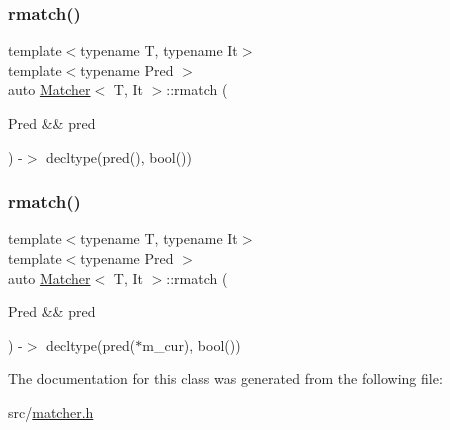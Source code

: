 \mbox{\label{class_matcher_a016cf13b6cf1119494a9723fb9419fd4}} 
\subsubsection{\texorpdfstring{rmatch()}{rmatch()}\hspace{0.1cm}{\footnotesize\ttfamily [1/2]}}
{\footnotesize\ttfamily template$<$typename T, typename It$>$ \\
template$<$typename Pred $>$ \\
auto \hyperlink{class_matcher}{Matcher}$<$ T, It $>$\+::rmatch (\begin{DoxyParamCaption}\item[{Pred \&\&}]{pred }\end{DoxyParamCaption}) -\/$>$ decltype(pred(), bool())
  \hspace{0.3cm}{\ttfamily [inline]}}

\mbox{\label{class_matcher_ad0b897b87cede7752c385e7d55bcaff4}} 
\subsubsection{\texorpdfstring{rmatch()}{rmatch()}\hspace{0.1cm}{\footnotesize\ttfamily [2/2]}}
{\footnotesize\ttfamily template$<$typename T, typename It$>$ \\
template$<$typename Pred $>$ \\
auto \hyperlink{class_matcher}{Matcher}$<$ T, It $>$\+::rmatch (\begin{DoxyParamCaption}\item[{Pred \&\&}]{pred }\end{DoxyParamCaption}) -\/$>$ decltype(pred($\ast$m\+\_\+cur), bool())
  \hspace{0.3cm}{\ttfamily [inline]}}



The documentation for this class was generated from the following file\+:\begin{DoxyCompactItemize}
\item 
src/\hyperlink{matcher_8h}{matcher.\+h}\end{DoxyCompactItemize}
